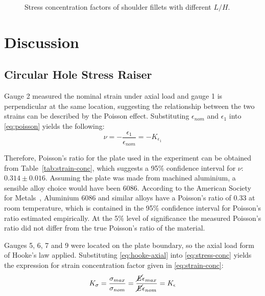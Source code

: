\documentclass[a4paper,11pt,twocolumn]{article}
\begin{document}
\begin{figure}[H]
    \small
    \centering
    \def\svgwidth{\linewidth}
    
    \caption{Stress concentration factors of shoulder fillets with different
        $L/H$.}
    \label{fig:simulation-results-length}
\end{figure}

\section{Discussion}

\subsection{Circular Hole Stress Raiser}

Gauge 2 measured the nominal strain under axial load and gauge 1 is
perpendicular at the same location, suggesting the relationship between the
two strains can be described by the Poisson effect. Substituting
$\epsilon_{nom}$ and $\epsilon_1$ into \eqref{eq:poisson} yields the following:
\begin{equation*}
    \nu = -\frac{\epsilon_1}{\epsilon_{nom}} = -K_{\epsilon_1}
\end{equation*}

Therefore, Poisson's ratio for the plate used in the experiment can be obtained
from Table~\vref{tab:strain-conc}, which suggests a 95\% confidence interval
for $\nu$: $0.314\pm0.016$. Assuming the plate was made from machined aluminium,
a sensible alloy choice would have been 6086. According to the American Society
for Metals~\cite{asm1978metals}, Aluminium 6086 and similar alloys have a
Poisson's ratio of 0.33 at room temperature, which is contained in the 95\%
confidence interval for Poisson's ratio estimated empirically. At the 5\% level
of significance the measured Poisson's ratio did not differ from the true
Poisson's ratio of the material.

Gauges 5, 6, 7 and 9 were located on the plate boundary, so the axial load
form of Hooke's law applied. Substituting \eqref{eq:hooke-axial} into 
\eqref{eq:stress-conc} yields the expression for strain concentration factor 
given in \eqref{eq:strain-conc}:
\begin{equation} \label{eq:equiv-conc}
    K_\sigma = \frac{\sigma_{max}}{\sigma_{nom}}
             = \frac{\cancel{E}\epsilon_{max}}{\cancel{E}\epsilon_{nom}}
             = K_\epsilon
\end{equation}
\end{document}
